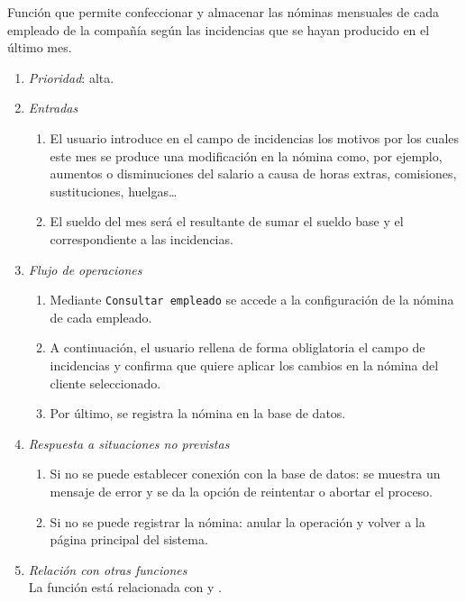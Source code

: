 

	Función que permite confeccionar y almacenar las nóminas mensuales de cada empleado de la compañía según las incidencias que se hayan producido en el último mes.
						
	\begin{enumerate}
		\item \textit{Prioridad}: alta.
		\item \textit{Entradas}
			\begin{enumerate}
				\item El usuario introduce en el campo de incidencias los motivos por los cuales este mes se produce una modificación en la nómina como, por ejemplo, aumentos o disminuciones del salario a causa de horas extras, comisiones, sustituciones, huelgas\ldots
				\item El sueldo del mes será el resultante de sumar el sueldo base y el correspondiente a las incidencias.
			\end{enumerate}
		\item \textit{Flujo de operaciones}
			\begin{enumerate}
				\item Mediante \verb|Consultar empleado| se accede a la configuración de la nómina de cada empleado. 
				\item A continuación, el usuario rellena de forma obliglatoria el campo de incidencias y confirma que quiere aplicar los cambios en la nómina del cliente seleccionado.
				\item Por último, se registra la nómina en la base de datos.
			\end{enumerate}
		\item \textit{Respuesta a situaciones no previstas}
			\begin{enumerate}
				\item Si no se puede establecer conexión con la base de datos: se muestra un mensaje de error y se da la opción de reintentar o abortar el proceso.
				\item Si no se puede registrar la nómina: anular la operación y volver a la página principal del sistema.
			\end{enumerate}				
		\item \textit{Relación con otras funciones}\\
		La función está relacionada con  y .
	\end{enumerate}
								
